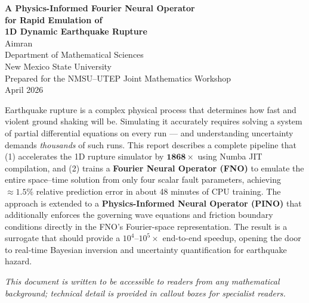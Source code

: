\documentclass[12pt, a4paper]{article}
\theoremstyle{definition}
\begin{document}

\begin{titlepage}
  \begin{center}
    \vspace*{1.5cm}
    {\LARGE\bfseries\color{myblue}
      A Physics-Informed Fourier Neural Operator\\[6pt]
      for Rapid Emulation of\\[6pt]
      1D Dynamic Earthquake Rupture}\\[1.5cm]

    {\large Aimran}\\[0.4cm]
    {\normalsize Department of Mathematical Sciences\\
    New Mexico State University}\\[1.5cm]

    {\normalsize Prepared for the NMSU--UTEP Joint Mathematics Workshop\\
    April 2026}\\[2cm]

    \begin{tcolorbox}[highlight=myblue, title=Abstract, width=0.95\linewidth]
      Earthquake rupture is a complex physical process that determines how fast and
      violent ground shaking will be. Simulating it accurately requires solving a
      system of partial differential equations on every run — and understanding
      uncertainty demands \textit{thousands} of such runs.  This report describes
      a complete pipeline that (1) accelerates the 1D rupture simulator by
      $\bm{1868\times}$ using Numba JIT compilation, and (2) trains a
      \textbf{Fourier Neural Operator (FNO)} to emulate the entire
      space–time solution from only four scalar fault parameters, achieving
      $\approx\!1.5\%$ relative prediction error in about 48 minutes of CPU
      training.  The approach is extended to a
      \textbf{Physics-Informed Neural Operator (PINO)} that additionally
      enforces the governing wave equations and friction boundary conditions
      directly in the FNO's Fourier-space representation.
      The result is a surrogate that should provide a $10^4$–$10^5\times$
      end-to-end speedup, opening the door to real-time Bayesian inversion
      and uncertainty quantification for earthquake hazard.
    \end{tcolorbox}

    \vfill
    {\small \textit{This document is written to be accessible to readers from
    any mathematical background; technical detail is provided in callout boxes
    for specialist readers.}}
  \end{center}
\end{titlepage}
\end{document}
